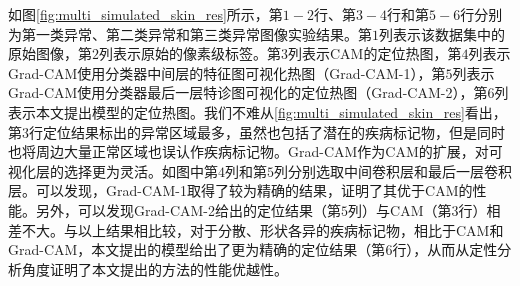 如图\ref{fig:multi_simulated_skin_res}所示，第$1-2$行、第$3-4$行和第$5-6$行分别为第一类异常、第二类异常和第三类异常图像实验结果。第$1$列表示该数据集中的原始图像，第$2$列表示原始的像素级标签。第$3$列表示CAM的定位热图，第$4$列表示Grad-CAM使用分类器中间层的特征图可视化热图（Grad-CAM-1），第$5$列表示Grad-CAM使用分类器最后一层特诊图可视化的定位热图（Grad-CAM-2），第$6$列表示本文提出模型的定位热图。我们不难从\ref{fig:multi_simulated_skin_res}看出，第$3$行定位结果标出的异常区域最多，虽然也包括了潜在的疾病标记物，但是同时也将周边大量正常区域也误认作疾病标记物。Grad-CAM作为CAM的扩展，对可视化层的选择更为灵活。如图中第$4$列和第$5$列分别选取中间卷积层和最后一层卷积层。可以发现，Grad-CAM-1取得了较为精确的结果，证明了其优于CAM的性能。另外，可以发现Grad-CAM-2给出的定位结果（第$5$列）与CAM（第$3$行）相差不大。与以上结果相比较，对于分散、形状各异的疾病标记物，相比于CAM和Grad-CAM，本文提出的模型给出了更为精确的定位结果（第$6$行），从而从定性分析角度证明了本文提出的方法的性能优越性。


